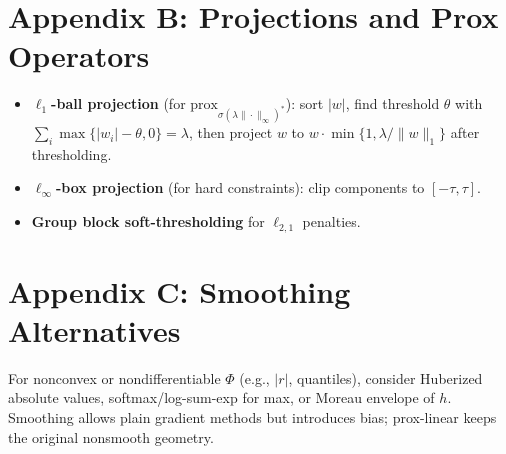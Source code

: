 \documentclass[11pt]{article}
\theoremstyle{plain}
\theoremstyle{definition}
\newcommand{\prox}{\mathrm{prox}}
\newcommand{\1}{\mathbf{1}}
\begin{document}
\section{Appendix B: Projections and Prox Operators}
\begin{itemize}[leftmargin=2em]
 \item \textbf{$\ell_1$-ball projection} (for $\prox_{\sigma (\lambda\|\cdot\|_\infty)^*}$): sort $|w|$, find threshold $\theta$ with $\sum_i \max\{|w_i|-\theta,0\}=\lambda$, then project $w$ to $w\cdot \min\{1,\lambda/\|w\|_1\}$ after thresholding.
 \item \textbf{$\ell_\infty$-box projection} (for hard constraints): clip components to $[-\tau,\tau]$.
 \item \textbf{Group block soft-thresholding} for $\ell_{2,1}$ penalties.
\end{itemize}

\section{Appendix C: Smoothing Alternatives}
For nonconvex or nondifferentiable $\Phi$ (e.g., $|r|$, quantiles), consider Huberized absolute values, softmax/log-sum-exp for max, or Moreau envelope of $h$.
Smoothing allows plain gradient methods but introduces bias; prox-linear keeps the original nonsmooth geometry.
\end{document}
